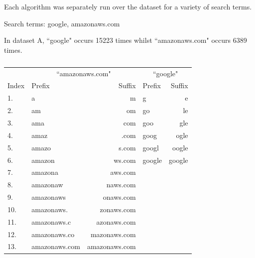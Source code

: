 \documentclass{article}
\begin{document}
Each algorithm was separately run over the dataset for a variety of search terms.

Search terms: google, amazonaws.com

In dataset A, ``google" occurs 15223 times whilst ``amazonaws.com" occurs 6389 times.

\begin{table}[hbt]
  \centering
  \begin{tabular}{l|l|r||l|r}
    & \multicolumn{2}{c}{``amazonaws.com"} & \multicolumn{2}{c}{``google"} \\
    Index & Prefix & Suffix & Prefix & Suffix \\
    \hline
    1. & a  & m  & g  & e \\
    2. & am  & om  & go  & le \\
    3. & ama  & com  & goo  & gle \\
    4. & amaz  & .com  & goog  & ogle \\
    5. & amazo  & s.com  & googl  & oogle \\
    6. & amazon  & ws.com  & google  & google \\
    7. & amazona  & aws.com  &  & \\
    8. & amazonaw  & naws.com  &  & \\
    9. & amazonaws  & onaws.com  &  & \\
    10. & amazonaws.  & zonaws.com  &  & \\
    11. & amazonaws.c  & azonaws.com  &  & \\
    12. & amazonaws.co  & mazonaws.com  &  & \\
    13. & amazonaws.com  & amazonaws.com  &  & 
  \end{tabular}
  \caption{}
\end{table}
\end{document}
